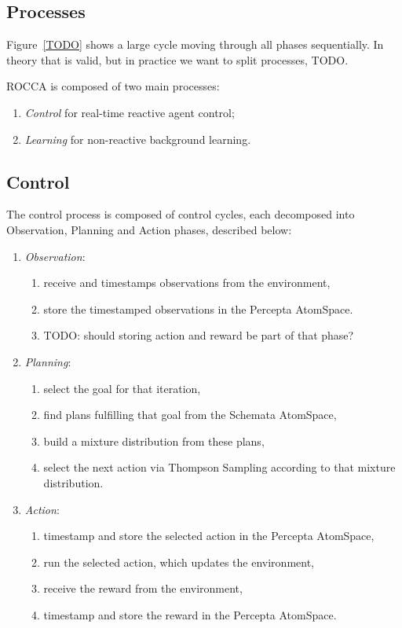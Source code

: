 \documentclass[runningheads]{llncs}
\begin{document}
\subsection{Processes}

Figure~\ref{TODO} shows a large cycle moving through all phases
sequentially.  In theory that is valid, but in practice we want to
split processes, TODO.

ROCCA is composed of two main processes:
\begin{enumerate}
\item \emph{Control} for real-time reactive agent control;
\item \emph{Learning} for non-reactive background learning.
\end{enumerate}

\subsection{Control}
The control process is composed of control cycles, each decomposed
into Observation, Planning and Action phases, described below:
\begin{enumerate}
\item \emph{Observation}:
  \begin{enumerate}
  \item receive and timestamps observations from the environment,
  \item store the timestamped observations in the Percepta AtomSpace.
  \item TODO: should storing action and reward be part of that phase?
  \end{enumerate}
\item \emph{Planning}:
  \begin{enumerate}
  \item select the goal for that iteration,
  \item find plans fulfilling that goal from the Schemata AtomSpace,
  \item build a mixture distribution from these plans,
  \item select the next action via Thompson Sampling according to that
    mixture distribution.
  \end{enumerate}
\item \emph{Action}:
  \begin{enumerate}
  \item timestamp and store the selected action in the Percepta
    AtomSpace,
  \item run the selected action, which updates the environment,
  \item receive the reward from the environment,
  \item timestamp and store the reward in the Percepta AtomSpace.
  \end{enumerate}
\end{enumerate}
\end{document}
